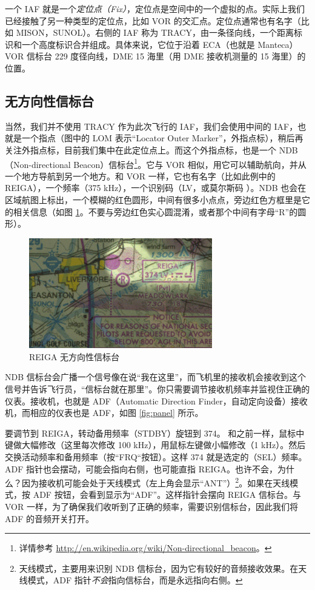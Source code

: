 一个 IAF 就是一个\emph{定位点（Fix）}，定位点是空间中的一个虚拟的点。实际上我们已经接触了另一种类型的定位点，比如 VOR 的交汇点。定位点通常也有名字（比如 MISON，SUNOL）。右侧的 IAF 称为 TRACY，由一条径向线，一个距离标识和一个高度标识合并组成。具体来说，它位于沿着 ECA（也就是 Manteca）VOR 信标台 229 度径向线，DME 15 海里（用 DME 接收机测量的 15 海里）的位置。

\subsection{无方向性信标台}

当然，我们并不使用 TRACY 作为此次飞行的 IAF，我们会使用中间的 IAF，也就是一个指点（图中的 LOM 表示“Locator Outer Marker”，外指点标），稍后再关注外指点标，目前我们集中在此定位点上。而这个外指点标，也是一个 NDB（Non-directional Beacon）信标台\footnote{详情参考 \url{http://en.wikipedia.org/wiki/Non-directional_beacon}。}。它与 VOR 相似，用它可以辅助航向，并从一个地方导航到另一个地方。和 VOR 一样，它也有名字（比如此例中的 REIGA），一个频率（375 kHz），一个识别码（LV，或莫尔斯码 {\mdot\mdash\mdot\mdot\mspace \mdot\mdot\mdot\mdash}）。NDB 也会在区域航图上标出，一个模糊的红色圆形，中间有很多小点点，旁边红色方框里是它的相关信息（如图 \ref{fig:NDB}。不要与旁边红色实心圆混淆，或者那个中间有字母“R”的圆形）。

\begin{figure}
  \begin{center}
    \includegraphics[width=8cm]{img/NDB}
    \caption{REIGA 无方向性信标台}
    \label{fig:NDB}
  \end{center}
\end{figure}

NDB 信标台会广播一个信号像在说“我在这里”，而飞机里的接收机会接收到这个信号并告诉飞行员，“信标台就在那里”。你只需要调节接收机频率并监视住正确的仪表。接收机，也就是 ADF（Automatic Direction Finder，自动定向设备）接收机，而相应的仪表也是 ADF，如图 \ref{fig:panel} 所示。

要调节到 REIGA，转动备用频率（STDBY）旋钮到 374。 和之前一样，鼠标中键做大幅修改（这里每次修改 100 kHz），用鼠标左键做小幅修改（1 kHz）。然后交换活动频率和备用频率（按“FRQ“按钮）。这样 374 就是选定的（SEL）频率。ADF 指针也会摆动，可能会指向右侧，也可能直指 REIGA。也许不会，为什么？因为接收机可能会处于天线模式（左上角会显示“ANT”）\footnote{天线模式，主要用来识别 NDB 信标台，因为它有较好的音频接收效果。在天线模式，ADF 指针\emph{不会}指向信标台，而是永远指向右侧。}。如果在天线模式，按 ADF 按钮，会看到显示为“ADF”。这样指针会摆向 REIGA 信标台。与 VOR 一样，为了确保我们收听到了正确的频率，需要识别信标台，因此我们将 ADF 的音频开关打开。

